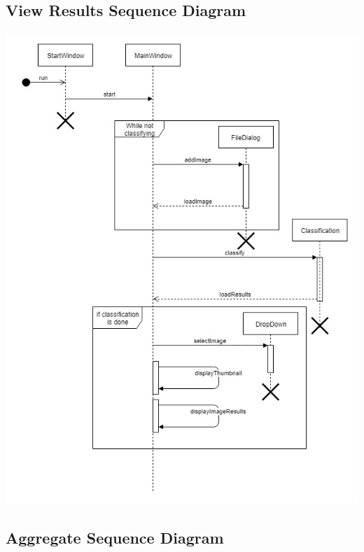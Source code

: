 \documentclass[parskip=full]{scrartcl}
\begin{document}
\pagebreak

\subsection {View Results Sequence Diagram}

\begin{center}
\includegraphics[width=1.0\textwidth]{ViewResults.jpg}
\end{center}

\pagebreak

\subsection {Aggregate Sequence Diagram}
\end{document}
